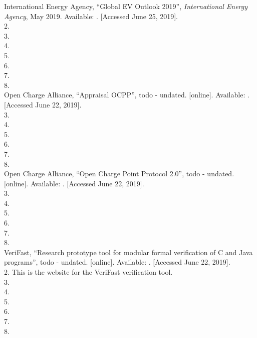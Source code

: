 \documentclass[12pt,openany,a4paper]{book}
\begin{document}
\cleardoublepage

\begin{thebibliography}{99}


 International Energy Agency, ``Global EV Outlook 2019'', \textit{International Energy Agency}, May 2019. Available: \href{https://webstore.iea.org/global-ev-outlook-2019}{}. [Accessed June 25, 2019]. \\
2. \\
3. \\
4. \\
5.  \\
6. \\
7. \\
8. \\



 Open Charge Alliance, ``Appraisal OCPP'',  todo - undated. [online]. Available: \href{https://www.openchargealliance.org/about-us/appraisal-ocpp/}{}. [Accessed June 22, 2019]. \\
3. \\
4. \\
5. \\
6. \\
7. \\
8. \\

 Open Charge Alliance, ``Open Charge Point Protocol 2.0'', todo - undated. [online]. Available: \href{https://www.openchargealliance.org/protocols/ocpp-20/}{}. [Accessed June 22, 2019]. \\
3. \\
4. \\
5. \\
6. \\
7. \\
8. \\



 VeriFast, ``Research prototype tool for modular formal verification of C and Java programs'', todo - undated. [online]. Available: \href{https://github.com/verifast/verifast/}{}. [Accessed June 22, 2019]. \\
2. This is the website for the VeriFast verification tool.\\
3. \\
4. \\
5. \\
6. \\
7. \\
8. \\




\end{thebibliography}
\end{document}
